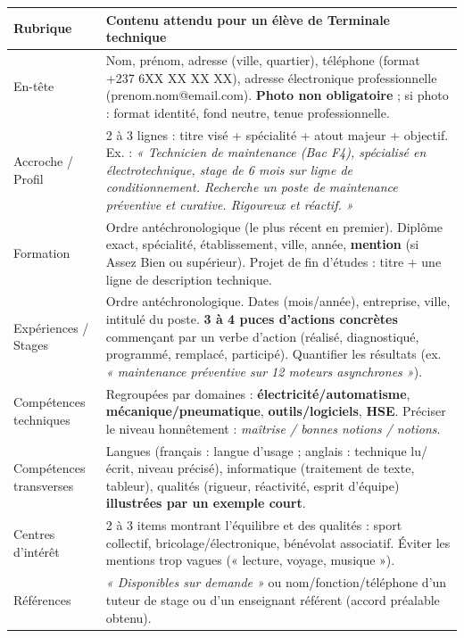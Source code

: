 \documentclass[11pt]{article}
\newcounter{popsec}
\newcounter{popsub}
\newcommand{\courssub}[1]{%
  \stepcounter{popsub}%
  \par\vspace{9pt}\noindent{\popxbold\fontsize{11.5}{13}\selectfont\color{popink}{\color{poporange}\thepopsec.\thepopsub}\hspace{6pt}#1}\par\nopagebreak\vspace{4pt}
}
\begin{document}
\courssub{Ressources à mobiliser}
\begin{aretenir}
\begin{tabularx}{\linewidth}{|l|X|}
\hline
\textbf{Rubrique} & \textbf{Contenu attendu pour un élève de Terminale technique} \\
\hline
En-tête & Nom, prénom, adresse (ville, quartier), téléphone (format +237 6XX XX XX XX), adresse électronique professionnelle (prenom.nom@email.com). \textbf{Photo non obligatoire} ; si photo : format identité, fond neutre, tenue professionnelle. \\
\hline
Accroche / Profil & 2 à 3 lignes : titre visé + spécialité + atout majeur + objectif. Ex. : \emph{« Technicien de maintenance (Bac F4), spécialisé en électrotechnique, stage de 6 mois sur ligne de conditionnement. Recherche un poste de maintenance préventive et curative. Rigoureux et réactif. »} \\
\hline
Formation & Ordre antéchronologique (le plus récent en premier). Diplôme exact, spécialité, établissement, ville, année, \textbf{mention} (si Assez Bien ou supérieur). Projet de fin d'études : titre + une ligne de description technique. \\
\hline
Expériences / Stages & Ordre antéchronologique. Dates (mois/année), entreprise, ville, intitulé du poste. \textbf{3 à 4 puces d'actions concrètes} commençant par un verbe d'action (réalisé, diagnostiqué, programmé, remplacé, participé). Quantifier les résultats (ex. \emph{« maintenance préventive sur 12 moteurs asynchrones »}). \\
\hline
Compétences techniques & Regroupées par domaines : \textbf{électricité/automatisme}, \textbf{mécanique/pneumatique}, \textbf{outils/logiciels}, \textbf{HSE}. Préciser le niveau honnêtement : \emph{maîtrise / bonnes notions / notions}. \\
\hline
Compétences transverses & Langues (français : langue d'usage ; anglais : technique lu/écrit, niveau précisé), informatique (traitement de texte, tableur), qualités (rigueur, réactivité, esprit d'équipe) \textbf{illustrées par un exemple court}. \\
\hline
Centres d'intérêt & 2 à 3 items montrant l'équilibre et des qualités : sport collectif, bricolage/électronique, bénévolat associatif. Éviter les mentions trop vagues (« lecture, voyage, musique »). \\
\hline
Références & \emph{« Disponibles sur demande »} ou nom/fonction/téléphone d'un tuteur de stage ou d'un enseignant référent (accord préalable obtenu). \\
\hline
\end{tabularx}
\end{aretenir}
\end{document}
